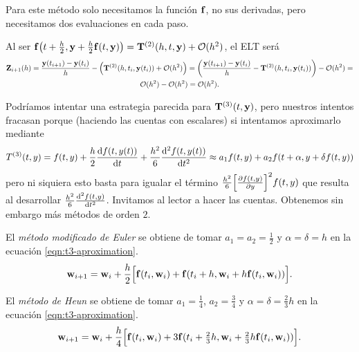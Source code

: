 \begin{remark}
    Para este método solo necesitamos la función $\vb{f}{}$, no sus derivadas,
    pero necesitamos dos evaluaciones en cada paso.
\end{remark}

\begin{remark}
    Al ser $\vb{f}{}\qty(t + \tfrac{h}{2}, \vb{y}{} + \tfrac{h}{2}\vb{f}{}(t, \vb{y}{})) =
    \vb{T}^{(2)}(h, t, \vb{y}{}) + \vb{\mathcal{O}}{}(h^2)$,
    el ELT será
    \begin{multline*}
        \vb{Z}{}_{i+1}(h) =
        \frac{\vb{y}{}(t_{i+1}) - \vb{y}{}(t_i)}{h} - \qty(
            \vb{T}^{(2)}(h, t_i, \vb{y}{}(t_i)) + \vb{\mathcal{O}}{}(h^2)
        ) =
        \qty(
            \frac{\vb{y}{}(t_{i+1}) - \vb{y}{}(t_i)}{h} - \vb{T}^{(2)}(h, t_i, \vb{y}{}(t_i))
        ) - \vb{\mathcal{O}}{}(h^2) = \\
        \vb{\mathcal{O}}{}(h^2) - \vb{\mathcal{O}}{}(h^2) = \vb{\mathcal{O}}{}(h^2).
    \end{multline*}
\end{remark}

Podríamos intentar una estrategia parecida para $\vb{T}^{(3)}(t, \vb{y}{})$,
pero nuestros intentos fracasan porque
(haciendo las cuentas con escalares)
si intentamos aproximarlo mediante
\begin{equation}\label{eqn:t3-aproximation}
    T^{(3)}(t,y) =
    f(t,y) + \frac{h}{2}\dv{f(t, y(t))}{t}
        + \frac{h^2}{6}\dv[2]{f(t, y(t))}{t} \approx
    a_1f(t,y) + a_2f(t + \alpha, y + \delta f(t,y))
\end{equation}
pero ni siquiera esto basta para igualar el término
$\frac{h^2}{6}\qty[\pdv{f(t, y)}{y}]^2f(t,y)$
que resulta al desarrollar $\frac{h^2}{6}\dv[2]{f(t, y)}{t}$.
Invitamos al lector a hacer las cuentas.
Obtenemos sin embargo más métodos de orden $2$.

\begin{method}
    El \emph{método modificado de Euler} se obtiene de
    tomar $a_1 = a_2 = \frac{1}{2}$ y $\alpha = \delta = h$
    en la ecuación  \eqref{eqn:t3-aproximation}.
    \begin{equation*}
        \vb{w}{}_{i+1} = \vb{w}{}_i + \frac{h}{2}\qty\Big[
            \vb{f}{}(t_i, \vb{w}{}_i) + \vb{f}{}(t_i + h, \vb{w}{}_i + h\vb{f}{}(t_i,\vb{w}{}_i))
        ].
    \end{equation*}
\end{method}

\begin{method}
    El \emph{método de Heun} se obtiene de tomar $a_1 = \frac{1}{4}$,
    $a_2 = \frac{3}{4}$ y $\alpha = \delta = \frac{2}{3}h$
    en la ecuación \eqref{eqn:t3-aproximation}.
    \begin{equation*}
        \vb{w}{}_{i+1} = \vb{w}{}_i + \frac{h}{4}\qty\Big[
            \vb{f}{}(t_i, \vb{w}{}_i) +
            3\vb{f}{}(t_i + \tfrac{2}{3}h, \vb{w}{}_i + \tfrac{2}{3}h\vb{f}{}(t_i, \vb{w}{}_i))
        ].
    \end{equation*}

\end{method}

